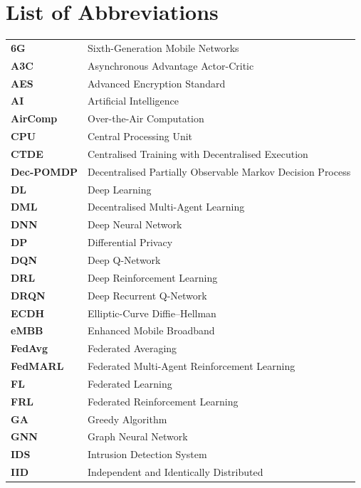 \documentclass[12pt,a4paper,final]{extreport}
\begin{document}
\chapter*{List of Abbreviations}

\begingroup
{}
\begin{longtable}{p{2.6cm}l}
\textbf{6G} & Sixth-Generation Mobile Networks \\
\textbf{A3C} & Asynchronous Advantage Actor-Critic \\
\textbf{AES} & Advanced Encryption Standard \\
\textbf{AI} & Artificial Intelligence \\
\textbf{AirComp} & Over-the-Air Computation \\
\textbf{CPU} & Central Processing Unit \\
\textbf{CTDE} & Centralised Training with Decentralised Execution \\
\textbf{Dec-POMDP} & Decentralised Partially Observable Markov Decision Process \\
\textbf{DL} & Deep Learning \\
\textbf{DML} & Decentralised Multi-Agent Learning \\
\textbf{DNN} & Deep Neural Network \\
\textbf{DP} & Differential Privacy \\
\textbf{DQN} & Deep Q-Network \\
\textbf{DRL} & Deep Reinforcement Learning \\
\textbf{DRQN} & Deep Recurrent Q-Network \\
\textbf{ECDH} & Elliptic-Curve Diffie--Hellman \\
\textbf{eMBB} & Enhanced Mobile Broadband \\
\textbf{FedAvg} & Federated Averaging \\
\textbf{FedMARL} & Federated Multi-Agent Reinforcement Learning \\
\textbf{FL} & Federated Learning \\
\textbf{FRL} & Federated Reinforcement Learning \\
\textbf{GA} & Greedy Algorithm \\
\textbf{GNN} & Graph Neural Network \\
\textbf{IDS} & Intrusion Detection System \\
\textbf{IID} & Independent and Identically Distributed \\

\end{longtable}
\end{document}
